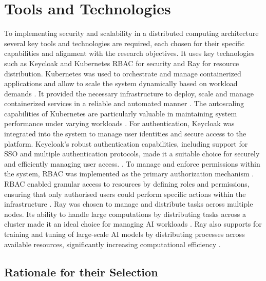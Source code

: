 \section{Tools and Technologies}

To implementing security and scalability in a distributed computing architecture several key tools and technologies are required, each chosen for their specific capabilities and alignment with the research objectives. It uses key technologies such as Keycloak and Kubernetes RBAC for security and Ray for resource distribution. Kubernetes was used to orchestrate and manage containerized applications and allow to scale the system dynamically based on workload demands \cite{Kubernetes_doc}. It provided the necessary infrastructure to deploy, scale and manage containerized services in a reliable and automated manner  \cite{Kubernetes_doc}. The autoscaling capabilities of Kubernetes are particularly valuable in maintaining system performance under varying workloads \cite{Kubernetes_doc}. For authentication, Keycloak was integrated into the system to manage user identities and secure access to the platform. Keycloak's robust authentication capabilities, including support for SSO and multiple authentication protocols, made it a suitable choice for securely and efficiently managing user access. \cite{keycloak_doc}. To manage and enforce permissions within the system, RBAC was implemented as the primary authorization mechanism  \cite{Kubernetes_doc}. RBAC enabled granular access to resources by defining roles and permissions, ensuring that only authorised users could perform specific actions within the infrastructure \cite{Kubernetes_doc}. Ray was chosen to manage and distribute tasks across multiple nodes. Its ability to handle large computations by distributing tasks across a cluster made it an ideal choice for managing AI workloads \cite{moritz}. Ray also supports for training and tuning of large-scale AI models by distributing processes across available resources, significantly increasing computational efficiency \cite{moritz}.


\subsection{Rationale for their Selection}

